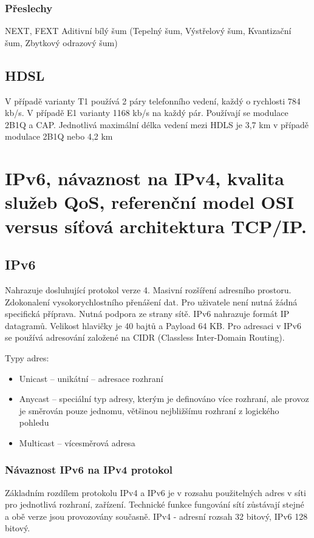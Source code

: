 \subsubsection{Přeslechy}
NEXT, FEXT
Aditivní bílý šum (Tepelný šum, Výstřelový šum, Kvantizační šum, Zbytkový odrazový šum)

\subsection{HDSL}
V případě varianty T1 používá 2 páry telefonního vedení, každý o rychlosti 784 kb/s. V případě E1 varianty 1168 kb/s na každý pár. Používají se modulace 2B1Q a CAP. Jednotlivá maximální délka vedení mezi HDLS je 3,7 km v případě modulace 2B1Q nebo 4,2 km

\clearpage
\section{IPv6, návaznost na IPv4, kvalita služeb QoS, referenční model OSI versus síťová architektura TCP/IP.}

\subsection{IPv6}
Nahrazuje dosluhující protokol verze 4. Masivní rozšíření adresního prostoru. Zdokonalení vysokorychlostního přenášení dat. Pro uživatele není nutná žádná specifická příprava. Nutná podpora ze strany sítě. IPv6 nahrazuje formát IP datagramů. Velikost hlavičky je 40 bajtů a Payload 64 KB. Pro adresaci v IPv6 se používá adresování založené na CIDR (Classless Inter-Domain Routing). 

Typy adres:
\begin{itemize}
    \item Unicast – unikátní – adresace rozhraní
    \item Anycast – speciální typ adresy, kterým je definováno více rozhraní, ale provoz je směrován pouze jednomu, většinou nejbližšímu rozhraní z logického pohledu
    \item Multicast – vícesměrová adresa
\end{itemize}

\subsubsection{Návaznost IPv6 na IPv4 protokol}
Základním rozdílem protokolu IPv4 a IPv6 je v rozsahu použitelných adres v síti pro jednotlivá rozhraní, zařízení. Technické funkce fungování sítí zůstávají stejné a obě verze jsou provozovány současně. IPv4 - adresní rozsah 32 bitový, IPv6 128 bitový.


